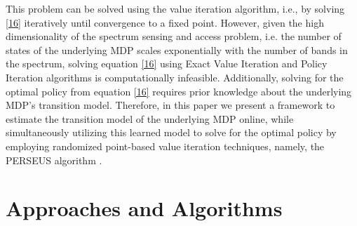 \documentclass[10pt,twocolumn]{IEEEtran}
\begin{document}
This problem can be solved using the value iteration algorithm, i.e., by solving \eqref{16} iteratively until convergence to a fixed point. However, given the high dimensionality of the spectrum sensing and access problem, i.e. the number of states of the underlying MDP scales exponentially with the number of bands in the spectrum, solving equation \eqref{16} using Exact Value Iteration and Policy Iteration algorithms is computationally infeasible. Additionally, solving for the optimal policy from equation \eqref{16} requires prior knowledge about the underlying MDP's transition model. Therefore, in this paper we present a framework to estimate the transition model of the underlying MDP online, while simultaneously utilizing this learned model to solve for the optimal policy by employing randomized point-based value iteration techniques, namely, the PERSEUS algorithm \cite{DBLP:journals/corr/abs-1109-2145}.
\vspace{-3mm}
\section{Approaches and Algorithms}\label{III}
\end{document}
